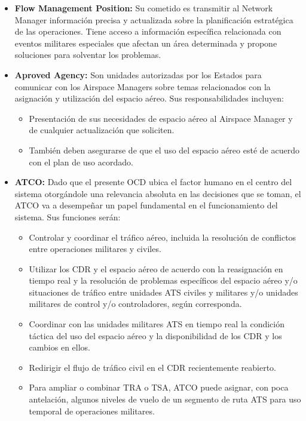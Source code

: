 \begin{itemize}
    \item \textbf{Flow Management Position:} Su cometido es transmitir al Network Manager información precisa y actualizada sobre la planificación estratégica de las operaciones. Tiene acceso a información específica relacionada con eventos militares especiales que afectan un área determinada y propone soluciones para solventar los problemas.
    \item \textbf{Aproved Agency:} Son unidades autorizadas por los Estados para comunicar con los Airspace Managers sobre temas relacionados con la asignación y utilización del espacio aéreo. Sus responsabilidades incluyen:
    \begin{itemize}
        \item Presentación de sus necesidades de espacio aéreo al Airspace Manager y de cualquier actualización que soliciten.
        \item También deben asegurarse de que el uso del espacio aéreo esté de acuerdo con el plan de uso acordado.
    \end{itemize}

    \item \textbf{ATCO:} Dado que el presente OCD ubica el factor humano en el centro del sistema otorgándole una relevancia absoluta en las decisiones que se toman, el ATCO va a desempeñar un papel fundamental en el funcionamiento del sistema. Sus funciones serán:
    \begin{itemize}
        \item Controlar y coordinar el tráfico aéreo, incluida la resolución de conflictos entre operaciones militares y civiles.
        \item Utilizar los CDR y el espacio aéreo de acuerdo con la reasignación en tiempo real y la resolución de problemas específicos del espacio aéreo y/o situaciones de tráfico entre unidades ATS civiles y militares y/o unidades militares de control y/o controladores, según corresponda.
        \item Coordinar con las unidades militares ATS en tiempo real la condición táctica del uso del espacio aéreo y la disponibilidad de los CDR y los cambios en ellos.
        \item Redirigir el flujo de tráfico civil en el CDR recientemente reabierto.
        \item Para ampliar o combinar TRA o TSA, ATCO puede asignar, con poca antelación, algunos niveles de vuelo de un segmento de ruta ATS para uso temporal de operaciones militares.
    \end{itemize}
\end{itemize}
